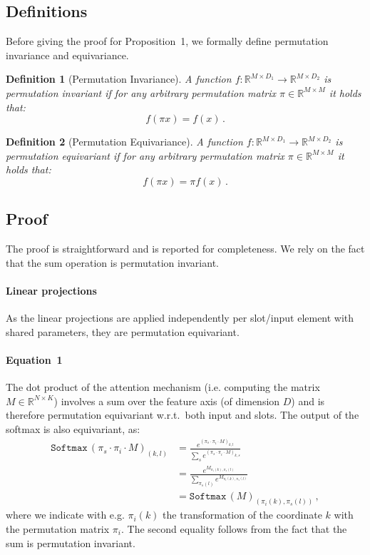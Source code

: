 \documentclass{article}
\newtheorem{definition}{Definition}
\newcommand{\softmax}[1]{\texttt{Softmax}\,(#1)}
\begin{document}
\subsection{Definitions}
Before giving the proof for Proposition~1, we formally define permutation invariance and equivariance.
\begin{definition}[Permutation Invariance]
A function $f: \mathbb{R}^{M\times D_1} \rightarrow \mathbb{R}^{M\times D_2}$ is \emph{permutation invariant} if for any arbitrary permutation matrix $\pi\in\mathbb{R}^{M\times M}$ it holds that:
\begin{equation*}
    f(\pi x) = f(x) \, .
\end{equation*}
\end{definition}
\begin{definition}[Permutation Equivariance]
A function $f: \mathbb{R}^{M\times D_1} \rightarrow \mathbb{R}^{M\times D_2}$ is \emph{permutation equivariant} if for any arbitrary permutation matrix $\pi\in\mathbb{R}^{M\times M}$ it holds that:
\begin{equation*}
    f(\pi x) = \pi f(x) \, .
\end{equation*}
\end{definition}
\subsection{Proof}

The proof is straightforward and is reported for completeness. We rely on the fact that the sum operation is permutation invariant.
\paragraph{Linear projections} As the linear projections are applied independently per slot/input element with shared parameters, they are permutation equivariant.

\paragraph{Equation~1}
The dot product of the attention mechanism (i.e. computing the matrix $M\in\mathbb{R}^{N\times K}$) involves a sum over the feature axis (of dimension $D$) and is therefore permutation equivariant w.r.t.~both input and slots. The output of the softmax is also equivariant, as:
\begin{align*}
    \softmax{\pi_s\cdot \pi_i \cdot M}_{(k,l)} &= \frac{e^{(\pi_s\cdot \pi_i \cdot M)_{k,l}}}{\sum_s e^{(\pi_s\cdot \pi_i \cdot M)_{k,s}}} \\&=  \frac{e^{M_{\pi_i(k),\pi_s(l)}}}{\sum_{\pi_s(l)} e^{M_{\pi_i(k),\pi_s(l)}}} \\&= \softmax{M}_{(\pi_i(k),\pi_s(l))}\,,
\end{align*}
where we indicate with e.g. $\pi_i(k)$ the transformation of the coordinate $k$ with the permutation matrix $\pi_i$. The second equality follows from the fact that the sum is permutation invariant.
\end{document}
